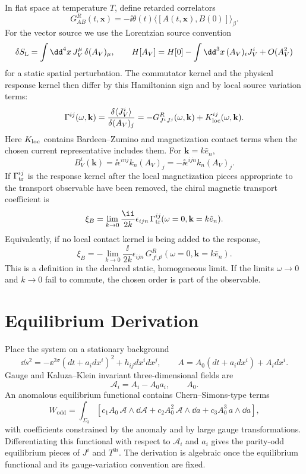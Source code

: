 In flat space at temperature \(T\), define retarded correlators
\[
  G^{R}_{AB}(t,\mathbf x)
  =
  -\ii\theta(t)\langle[A(t,\mathbf x),B(0)]\rangle_\beta .
\]
For the vector source we use the Lorentzian source convention
\[
  \delta S_{\rm L}
  =
  \int\dd^4x\,J_V^\mu\,\delta(A_V)_\mu ,
  \qquad
  H[A_V]=H[0]-\int\dd^3x\,(A_V)_iJ_V^i+O(A_V^2)
\]
for a static spatial perturbation.  The commutator kernel and the physical
response kernel then differ by this Hamiltonian sign and by local source
variation terms:
\[
  \Gamma^{ij}(\omega,\mathbf k)
  =
  \frac{\delta\langle J_V^i\rangle}{\delta(A_V)_j}
  =
  -G^R_{J^iJ^j}(\omega,\mathbf k)+K_{\rm loc}^{ij}(\omega,\mathbf k).
\]
Here \(K_{\rm loc}\) contains Bardeen--Zumino and magnetization contact
terms when the chosen current representative includes them.  For
\(\mathbf k=k\hat e_n\),
\[
  B_V^i(\mathbf k)
  =
  \ii\epsilon^{inj}k_n(A_V)_j
  =
  -\ii\epsilon^{ijn}k_n(A_V)_j .
\]
If \(\Gamma_{\rm tr}^{ij}\) is the response kernel after the local
magnetization pieces appropriate to the transport observable have been
removed, the chiral magnetic transport coefficient is
\[
  \xi_B
  =
  \lim_{k\to0}
  \frac{\ii}{2k}
  \epsilon_{ijn}\,
  \Gamma_{\rm tr}^{ij}(\omega=0,\mathbf k=k\hat e_n).
\]
Equivalently, if no local contact kernel is being added to the response,
\[
  \xi_B
  =
  -\lim_{k\to0}
  \frac{\ii}{2k}
  \epsilon_{ijn}\,
  G^R_{J^iJ^j}(\omega=0,\mathbf k=k\hat e_n).
\]
This is a definition in the declared static, homogeneous limit.  If the
limits \(\omega\to0\) and \(k\to0\) fail to commute, the chosen order is part
of the observable.

\section{Equilibrium Derivation}

Place the system on a stationary background
\[
  \dd s^2= -\ee^{2\sigma}(dt+a_i dx^i)^2+h_{ij}dx^i dx^j,
  \qquad
  A=A_0(dt+a_i dx^i)+A_i dx^i .
\]
Gauge and Kaluza--Klein invariant three-dimensional fields are
\[
  \mathcal A_i=A_i-A_0a_i,\qquad A_0 .
\]
An anomalous equilibrium functional contains Chern--Simons-type terms
\[
  W_{\mathrm{odd}}
  =
  \int_{\Sigma_3}
  \left[
    c_1 A_0\,\mathcal A\wedge\dd\mathcal A
    +
    c_2 A_0^2\,\mathcal A\wedge\dd a
    +
    c_3 A_0^3\,a\wedge\dd a
  \right],
\]
with coefficients constrained by the anomaly and by large gauge
transformations.  Differentiating this functional with respect to
\(\mathcal A_i\) and \(a_i\) gives the parity-odd equilibrium pieces of
\(J^i\) and \(T^{0i}\).  The derivation is algebraic once the equilibrium
functional and its gauge-variation convention are fixed.

